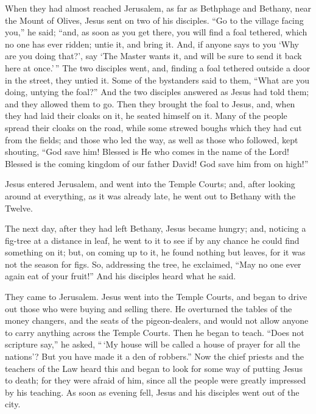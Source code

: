  When they had almost reached Jerusalem, as far as Bethphage
and Bethany, near the Mount of Olives, Jesus sent on two of his
disciples.  ``Go to the village facing you,'' he said;
``and, as soon as you get there, you will find a foal tethered, which no
one has ever ridden; untie it, and bring it.  And, if anyone
says to you `Why are you doing that?', say `The Master wants it, and
will be sure to send it back here at once.'\,''  The two
disciples went, and, finding a foal tethered outside a door in the
street, they untied it.  Some of the bystanders said to
them, ``What are you doing, untying the foal?''  And the two
disciples answered as Jesus had told them; and they allowed them to go.
 Then they brought the foal to Jesus, and, when they had
laid their cloaks on it, he seated himself on it.  Many of
the people spread their cloaks on the road, while some strewed boughs
which they had cut from the fields;  and those who led the
way, as well as those who followed, kept shouting, ``God save him!
Blessed is He who comes in the name of the Lord!  Blessed
is the coming kingdom of our father David! God save him from on high!''

 Jesus entered Jerusalem, and went into the Temple Courts;
and, after looking around at everything, as it was already late, he went
out to Bethany with the Twelve.

 The next day, after they had left Bethany, Jesus became
hungry;  and, noticing a fig-tree at a distance in leaf, he
went to it to see if by any chance he could find something on it; but,
on coming up to it, he found nothing but leaves, for it was not the
season for figs.  So, addressing the tree, he exclaimed,
``May no one ever again eat of your fruit!'' And his disciples heard
what he said.

 They came to Jerusalem. Jesus went into the Temple Courts,
and began to drive out those who were buying and selling there. He
overturned the tables of the money changers, and the seats of the
pigeon-dealers,  and would not allow anyone to carry
anything across the Temple Courts.  Then he began to teach.
``Does not scripture say,'' he asked, ``\,`My house will be called a
house of prayer for all the nations'? But you have made it a den of
robbers.''  Now the chief priests and the teachers of the
Law heard this and began to look for some way of putting Jesus to death;
for they were afraid of him, since all the people were greatly impressed
by his teaching.  As soon as evening fell, Jesus and his
disciples went out of the city.

